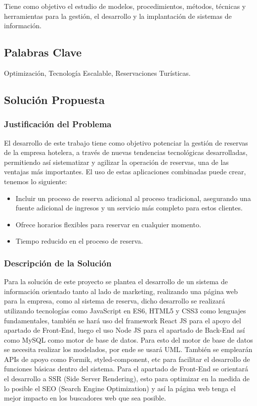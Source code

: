 \documentclass[12pt,a4paper,oneside]{article}
\begin{document}
    Tiene como objetivo el estudio de modelos, procedimientos, métodos, técnicas y herramientas para la gestión, el desarrollo y la implantación de sistemas de información.
\subsection{Palabras Clave}
    Optimización, Tecnología Escalable, Reservaciones Turísticas.
\subsection{Solución Propuesta}
\subsubsection{Justificación del Problema}
    El desarrollo de este trabajo tiene como objetivo potenciar la gestión de reservas de la empresa hotelera, a través de nuevas tendencias tecnológicas desarrolladas, permitiendo así sistematizar y agilizar la operación de reservas, una de las ventajas más importantes. El uso de estas aplicaciones combinadas puede crear, tenemos lo siguiente:
    
    \begin{itemize}
        \item {Incluir un proceso de reserva adicional al proceso tradicional, asegurando una fuente adicional de ingresos y un servicio más completo para estos clientes.}
        \item {Ofrece horarios flexibles para reservar en cualquier momento.}
        \item {Tiempo reducido en el proceso de reserva.}
    \end{itemize}

\subsubsection{Descripción de la Solución}

    Para la solución de este proyecto se plantea el desarrollo de un sistema de información orientado tanto al lado de marketing, realizando una página web para la empresa, como al sistema de reserva, dicho desarrollo se realizará utilizando tecnologías como JavaScript en ES6, HTML5 y CSS3 como lenguajes fundamentales, también se hará uso del framework React JS para el apoyo del apartado de Front-End, luego el uso Node JS para el apartado de Back-End así como MySQL como motor de base de datos. Para esto del motor de base de datos se necesita realizar los modelados, por ende se usará UML. También se emplearán APIs de apoyo como Formik, styled-component, etc para facilitar el desarrollo de funciones básicas dentro del sistema. 
    Para el apartado de Front-End se orientará el desarrollo a SSR (Side Server Rendering), esto para optimizar en la medida de lo posible el SEO (Search Engine Optimization) y así la página web tenga el mejor impacto en los buscadores web que sea posible.
\end{document}

